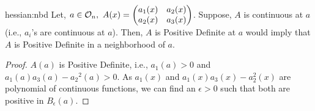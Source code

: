 \documentclass[../Analysis-3.tex]{subfiles}
\begin{document}
\begin{Lem}{}{hessian:nbd}
  Let, $a \in \mathcal{O}_{n},\ A(x) = \begin{pmatrix}
      a_1(x) & a_2(x) \\
      a_2(x) & a_3(x)
    \end{pmatrix}$. Suppose, $A$ is continuous at $a$ (i.e., $a_i$'s are continuous at $a$). Then, $A$ is Positive Definite at $a$ would imply that $A$ is Positive Definite in a neighborhood of $a$.
\end{Lem}

\begin{proof}
  $ A(a) $ is Positive Definite, i.e., $ a_1(a) > 0 $ and $ a_1(a) a_3(a) - {a_2}^2(a) > 0 $. As $ a_1(x) $ and $ a_1(x)a_3(x) - a_2^2(x) $ are polynomial of continuous functions, we can find an $ \epsilon > 0 $ such that both are positive in $ B_{\epsilon}(a) $.
\end{proof}
\end{document}
